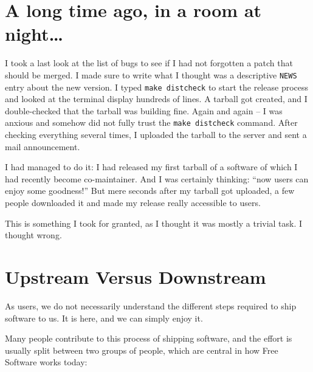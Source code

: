 

\section*{A long time ago, in a room at night\ldots}

I took a last look at the list of bugs to see if I had not forgotten a patch
that should be merged. I made sure to write what I thought was a descriptive
\texttt{NEWS} entry about the new version. I typed \texttt{make distcheck} to
start the release process and looked at the terminal display hundreds of lines.
A tarball got created, and I double-checked that the tarball was building fine.
Again and again -- I was anxious and somehow did not fully trust the
\texttt{make distcheck} command. After checking everything several times, I
uploaded the tarball to the server and sent a mail announcement.

I had managed to do it: I had released my first tarball of a software of which
I had recently become co-maintainer. And I was certainly thinking: ``now users
can enjoy some goodness!'' But mere seconds after my tarball got uploaded, a few
people downloaded it and made my release really accessible to users.

This is something I took for granted, as I thought it was mostly a trivial
task. I thought wrong.

\section*{Upstream Versus Downstream}

As users, we do not necessarily understand the different steps required to ship
software to us. It is here, and we can simply enjoy it.

Many people contribute to this process of shipping software, and the effort is
usually split between two groups of people, which are central in how Free
Software works today:

